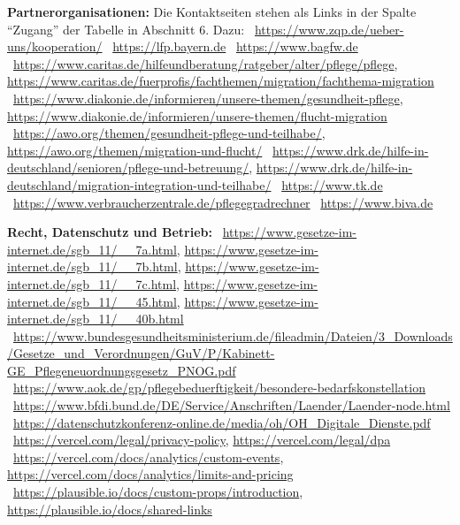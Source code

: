 \documentclass[10pt,parskip=half-]{scrartcl}
\begin{document}
{\tiny\raggedright\textbf{Partnerorganisationen:}
Die Kontaktseiten stehen als Links in der Spalte \enquote{Zugang} der Tabelle in Abschnitt 6.
Dazu:
\textbullet~\url{https://www.zqp.de/ueber-uns/kooperation/}
\textbullet~\url{https://lfp.bayern.de}
\textbullet~\url{https://www.bagfw.de}
\textbullet~\url{https://www.caritas.de/hilfeundberatung/ratgeber/alter/pflege/pflege},
        \url{https://www.caritas.de/fuerprofis/fachthemen/migration/fachthema-migration}
\textbullet~\url{https://www.diakonie.de/informieren/unsere-themen/gesundheit-pflege},
        \url{https://www.diakonie.de/informieren/unsere-themen/flucht-migration}
\textbullet~\url{https://awo.org/themen/gesundheit-pflege-und-teilhabe/},
        \url{https://awo.org/themen/migration-und-flucht/}
\textbullet~\url{https://www.drk.de/hilfe-in-deutschland/senioren/pflege-und-betreuung/},
        \url{https://www.drk.de/hilfe-in-deutschland/migration-integration-und-teilhabe/}
\textbullet~\url{https://www.tk.de}
\textbullet~\url{https://www.verbraucherzentrale.de/pflegegradrechner}
\textbullet~\url{https://www.biva.de}
\par}

{\tiny\raggedright\textbf{Recht, Datenschutz und Betrieb:}
\textbullet~\url{https://www.gesetze-im-internet.de/sgb_11/__7a.html},
        \url{https://www.gesetze-im-internet.de/sgb_11/__7b.html},
        \url{https://www.gesetze-im-internet.de/sgb_11/__7c.html},
        \url{https://www.gesetze-im-internet.de/sgb_11/__45.html},
        \url{https://www.gesetze-im-internet.de/sgb_11/__40b.html}
\textbullet~\url{https://www.bundesgesundheitsministerium.de/fileadmin/Dateien/3_Downloads/Gesetze_und_Verordnungen/GuV/P/Kabinett-GE_Pflegeneuordnungsgesetz_PNOG.pdf}
\textbullet~\url{https://www.aok.de/gp/pflegebeduerftigkeit/besondere-bedarfskonstellation}
\textbullet~\url{https://www.bfdi.bund.de/DE/Service/Anschriften/Laender/Laender-node.html}
\textbullet~\url{https://datenschutzkonferenz-online.de/media/oh/OH_Digitale_Dienste.pdf}
\textbullet~\url{https://vercel.com/legal/privacy-policy}, \url{https://vercel.com/legal/dpa}
\textbullet~\url{https://vercel.com/docs/analytics/custom-events},
        \url{https://vercel.com/docs/analytics/limits-and-pricing}
\textbullet~\url{https://plausible.io/docs/custom-props/introduction},
        \url{https://plausible.io/docs/shared-links}
\par}
\end{document}
